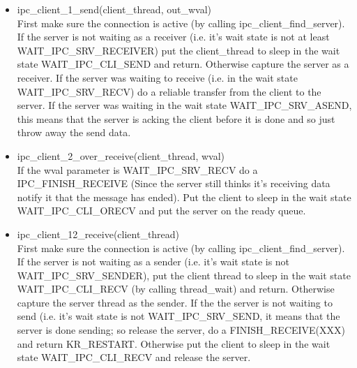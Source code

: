 \begin{itemize}
\item ipc_client_1_send(client_thread, out_wval)\\
  First make sure the connection is active (by calling
  ipc_client_find_server). If the server is not waiting as a receiver
  (i.e. it's wait state is not at least WAIT_IPC_SRV_RECEIVER) put the
  client_thread to sleep in the wait state WAIT_IPC_CLI_SEND and
  return. Otherwise capture the server as a receiver. If the server
  was waiting to receive (i.e. in the wait state 
  WAIT_IPC_SRV_RECV) do a reliable transfer from the client to the
  server. If the server was waiting in the wait state
  WAIT_IPC_SRV_ASEND, this means that the server is acking the client before
  it is done and so just throw away the send data.

\item ipc_client_2_over_receive(client_thread, wval)\\
  If the wval parameter is WAIT_IPC_SRV_RECV do a IPC_FINISH_RECEIVE
  (Since the server still thinks it's
  receiving data notify it that the message has ended).
  Put the client to sleep in the wait state WAIT_IPC_CLI_ORECV and put
  the server on the ready queue.

\item ipc_client_12_receive(client_thread)\\
  First make sure the connection is active (by calling
  ipc_client_find_server). If the server is not waiting as a sender
  (i.e. it's wait state is not WAIT_IPC_SRV_SENDER), put the client
  thread to sleep in the wait state WAIT_IPC_CLI_RECV (by calling
  thread_wait) and return. Otherwise capture the server thread as the
  sender. If the the server is not waiting to send (i.e. it's wait
  state is not WAIT_IPC_SRV_SEND, it means that the server is done
  sending; so release the server, do a FINISH_RECEIVE(XXX) and return
  KR_RESTART. Otherwise put the client to sleep in the wait state
  WAIT_IPC_CLI_RECV and release the server.

 \\
 \\



\end{itemize}
